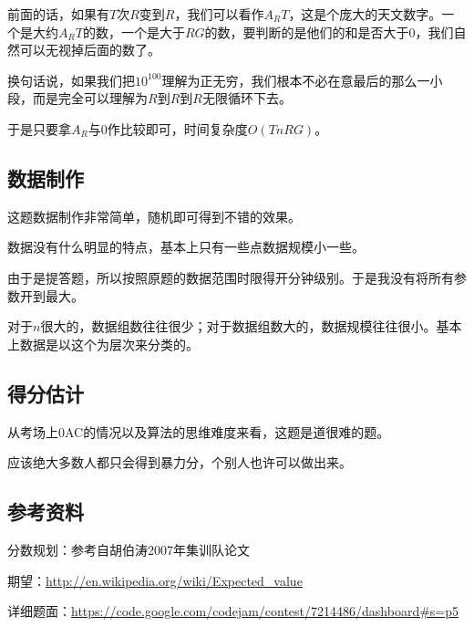 \documentclass{ctexart}
\begin{document}
			前面的话，如果有$T$次$R$变到$R$，我们可以看作$A_RT$，这是个庞大的天文数字。一个是大约$A_RT$的数，一个是大于$RG$的数，要判断的是他们的和是否大于0，我们自然可以无视掉后面的数了。

			换句话说，如果我们把$10^{100}$理解为正无穷，我们根本不必在意最后的那么一小段，而是完全可以理解为$R$到$R$到$R$无限循环下去。

			于是只要拿$A_R$与$0$作比较即可，时间复杂度$O(TnRG)$。
		\subsection{数据制作}
			这题数据制作非常简单，随机即可得到不错的效果。
	
			数据没有什么明显的特点，基本上只有一些点数据规模小一些。
	
			由于是提答题，所以按照原题的数据范围时限得开分钟级别。于是我没有将所有参数开到最大。

			对于$n$很大的，数据组数往往很少；对于数据组数大的，数据规模往往很小。基本上数据是以这个为层次来分类的。
		\subsection{得分估计}
			从考场上0AC的情况以及算法的思维难度来看，这题是道很难的题。

			应该绝大多数人都只会得到暴力分，个别人也许可以做出来。
		\subsection{参考资料}
			分数规划：参考自胡伯涛2007年集训队论文

			期望：\href{http://en.wikipedia.org/wiki/Expected_value}{http://en.wikipedia.org/wiki/Expected\_value}
		
			详细题面：\href{https://code.google.com/codejam/contest/7214486/dashboard#s=p5}{https://code.google.com/codejam/contest/7214486/dashboard\#s=p5}
\end{document}
